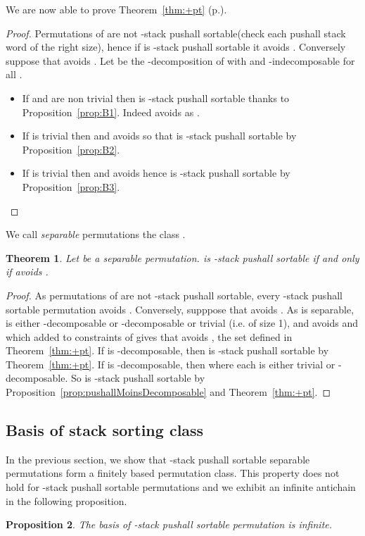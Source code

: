 \documentclass[11pt]{article}
\newtheorem{thm}{Theorem}[section]
\newtheorem{prop}[thm]{Proposition}
\newcommand{\pushall}{-stack pushall sortable\xspace}
\begin{document}
We are now able to prove Theorem~\ref{thm:+pt} (p.\pageref{thm:+pt}).

\begin{proof}
Permutations of  are not \pushall (check each pushall stack word of the right size), hence if  is \pushall it avoids . 
Conversely suppose that  avoids . 
Let  be the -decomposition of  with  and  -indecomposable for all .
\begin{itemize}
\item If  and  are non trivial then  is \pushall thanks to Proposition~\ref{prop:B1}. 
Indeed  avoids  as .
\item If  is trivial then  and  avoids  so that  is \pushall by Proposition~\ref{prop:B2}.
\item If  is trivial then  and  avoids  hence  is \pushall by Proposition~\ref{prop:B3}.
\end{itemize}
\end{proof}



We call {\em separable} permutations the class .

\begin{thm}
Let  be a separable permutation. 
 is \pushall if and only if  avoids .
\end{thm}
\begin{proof}
As permutations of  are not \pushall, every \pushall permutation avoids . 
Conversely, supppose that  avoids . 
As  is separable,  is either -decomposable or -decomposable or trivial (i.e. of size 1), and  avoids  and  which added to constraints of  gives that  avoids , the set defined in Theorem~\ref{thm:+pt}.
If  is -decomposable, then  is \pushall by Theorem~\ref{thm:+pt}.
If  is -decomposable, then  where each  is either trivial or -decomposable. 
So  is \pushall by Proposition~\ref{prop:pushallMoinsDecomposable} and Theorem~\ref{thm:+pt}.
\end{proof}





\subsection{Basis of stack sorting class}
In the previous section, we show that \pushall separable permutations form a finitely based permutation class. 
This property does not hold for \pushall permutations and we exhibit an infinite antichain in the following proposition.

\begin{prop}
The basis of \pushall permutation is infinite.
\end{prop}
\end{document}
